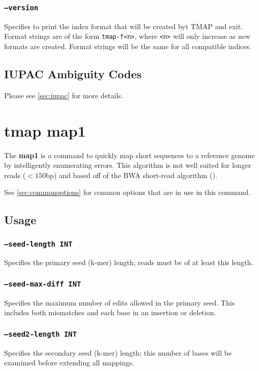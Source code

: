 \documentclass[a4paper,12pt]{book}
\newcommand{\TT}[1]{{\tt #1}} %
\newcommand{\BF}[1]{{\bf #1}} %
\begin{document}
\subsubsection{\TT{--version}}
Specifies to print the index format that will be created byt TMAP and exit.
Format strings are of the form \TT{tmap-f<n>}, where \TT{<n>} will only increase as new formats are created.
Format strings will be the same for all compatible indices.
\subsection{IUPAC Ambiguity Codes}
Please see \autoref{sec:iupac} for more details. 

\section{tmap map1}
\label{sec:map1}
The \BF{map1} is a command to quickly map short sequences to a reference genome by intelligently enumerating errors.
This algorithm is not well suited for longer reads ($<150$bp) and based off of the BWA short-read algorithm (\cite{BWA-short}).

See \autoref{sec:commonoptions} for common options that are in use in this command.

\subsection{Usage}

\subsubsection{\TT{--seed-length INT}}
Specifies the primary seed (k-mer) length; reads must be of at least this length.

\subsubsection{\TT{--seed-max-diff INT}}
Specifies the maximum number of edits allowed in the primary seed.
This includes both mismatches and each base in an insertion or deletion. 

\subsubsection{\TT{--seed2-length INT}}
Specifies the secondary seed (k-mer) length; this number of bases will be examimed before extending all mappings.
\end{document}
